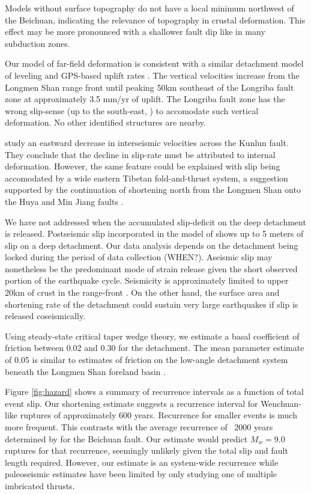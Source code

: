 \documentclass[12pt]{article}
\begin{document}
Models without surface topography do not have a local minimum northwest of the Beichuan, indicating the relevance of topography in crustal deformation. This effect may be more pronounced with a shallower fault dip like in many subduction zones.

Our model of far-field deformation is consistent with a similar detachment model of leveling and GPS-based uplift rates \citep{Hao2014}. The vertical velocities increase from the Longmen Shan range front until peaking 50km southeast of the Longriba fault zone at approximately 3.5 mm/yr of uplift. The Longriba fault zone has the wrong slip-sense (up to the south-east, \citep{Ren2013}) to accomodate such vertical deformation. No other identified structures are nearby. 


\citet{kirby07} study an eastward decrease in interseismic velocities across the Kunlun fault. They conclude that the decline in slip-rate must be attributed to internal deformation. However, the same feature could be explained with slip being accomodated by a wide eastern Tibetan fold-and-thrust system, a suggestion supported by the continuation of shortening north from the Longmen Shan onto the Huya \citep{kirby00} and Min Jiang faults \citep{Chen1994}.

We have not addressed when the accumulated slip-deficit on the deep detachment is released. Postseismic slip incorporated in the model of \cite{Qi2011} shows up to 5 meters of slip on a deep detachment. Our data analysis depends on the detachment being locked during the period of data collection (WHEN?). Aseismic slip may nonetheless be the predominant mode of strain release given the short observed portion of the earthquake cycle. Seismicity is approximately limited to upper 20km of crust in the range-front \citep{Li2010}. On the other hand, the surface area and shortening rate of the detachment could sustain very large earthquakes if slip is released coseismically. 

Using steady-state critical taper wedge theory, we estimate a basal coefficient of friction between 0.02 and 0.30 for the detachment. The mean parameter estimate of 0.05 is similar to estimates of friction on the low-angle detachment system beneath the Longmen Shan foreland basin \citep{Hubbard2010}.

Figure \ref{fig:hazard} shows a summary of recurrence intervals as a function of total event slip. Our shortening estimate suggests a recurrence interval for Wenchuan-like ruptures of approximately 600 years. Recurrence for smaller events is much more frequent. This contrasts with the average recurrence of ~2000 years determined by \citep{Ran2010} for the Beichuan fault. Our estimate would predict $M_w = $9.0 ruptures for that recurrence, seemingly unlikely given the total slip and fault length required. However, our estimate is an system-wide recurrence while paleoseismic estimates have been limited by only studying one of multiple imbricated thrusts. 
\end{document}
